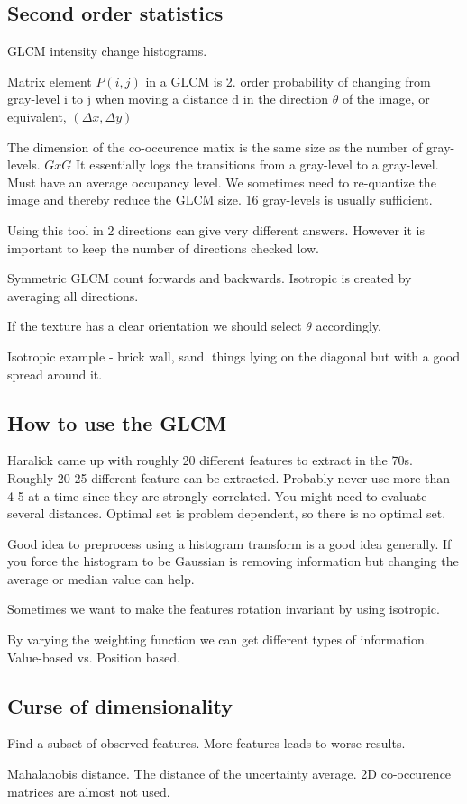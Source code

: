 \documentclass[a4paper,11pt]{article}
\begin{document}
	\subsection{Second order statistics}
	GLCM intensity change histograms.
	
	Matrix element $P(i,j)$ in a GLCM is 2. order probability of changing from gray-level i to j when moving a distance d in the direction $\theta$ of the image, or equivalent, $(\Delta x, \Delta y)$
	
	The dimension of the co-occurence matix is the same size as the number of gray-levels. $G x G$ It essentially logs the transitions from a gray-level to a gray-level. Must have an average occupancy level. We sometimes need to re-quantize the image and thereby reduce the GLCM size. 16 gray-levels is usually sufficient.
	
	Using this tool in 2 directions can give very different answers. However it is important to keep the number of directions checked low.
	
	Symmetric GLCM count forwards and backwards. Isotropic is created by averaging all directions.
	
	If the texture has a clear orientation we should select $\theta$ accordingly.
	
	Isotropic example - brick wall, sand. things lying on the diagonal but with a good spread around it.
	
	\subsection{How to use the GLCM}
	Haralick came up with roughly 20 different features to extract in the 70s. Roughly 20-25 different feature can be extracted. Probably never use more than 4-5 at a time since they are strongly correlated. You might need to evaluate several distances. Optimal set is problem dependent, so there is no optimal set.
	
	Good idea to preprocess using a histogram transform is a good idea generally. If you force the histogram to be Gaussian is removing information but changing the average or median value can help.
	
	Sometimes we want to make the features rotation invariant by using isotropic.
	
	By varying the weighting function we can get different types of information. Value-based vs. Position based.
	
	\subsection{Curse of dimensionality}
	Find a subset of observed features. More features leads to worse results.
	
	Mahalanobis distance. The distance of the uncertainty average. 2D co-occurence matrices are almost not used. 
\end{document}
